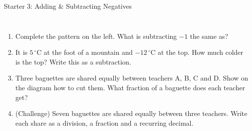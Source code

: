 \documentclass{beamer}
\newcommand{\ashow}[1]{\uncover<2->{\textcolor{red}{\small #1}}}
\newcommand{\tightlist}{%
  \setlength{\itemsep}{0pt}\setlength{\parskip}{0pt}\setlength{\topsep}{0pt}%
}
\newcommand{\dC}[1]{$#1\,^{\circ}$C}
\begin{document}
\begin{frame}[t]{Starter 3: Adding \& Subtracting Negatives}
\begin{columns}[T,onlytextwidth]
\vspace{-1.5em}
\footnotesize
\begin{enumerate}\tightlist
{\setlength{\columnsep}{14pt}%
}
  \item Complete the pattern on the left. What is subtracting $-1$ the same as?
        \ashow{Adding $1$}
  \item It is \dC{5} at the foot of a mountain and \dC{-12} at the top. How much colder
        is the top? Write this as a subtraction.
        \ashow{$5-(-12)=17$ degrees}
  \item Three baguettes are shared equally between teachers A, B, C and D. Show on
        the diagram how to cut them. What fraction of a baguette does each teacher get?
        \ashow{Three quarters of a baguette}
  \item (Challenge) Seven baguettes are shared equally between three teachers. Write
        each share as a division, a fraction and a recurring decimal.
        \ashow{$7\div3=\dfrac73=2.\dot{3}$}
\end{enumerate}
\end{columns}
\end{frame}
\end{document}
